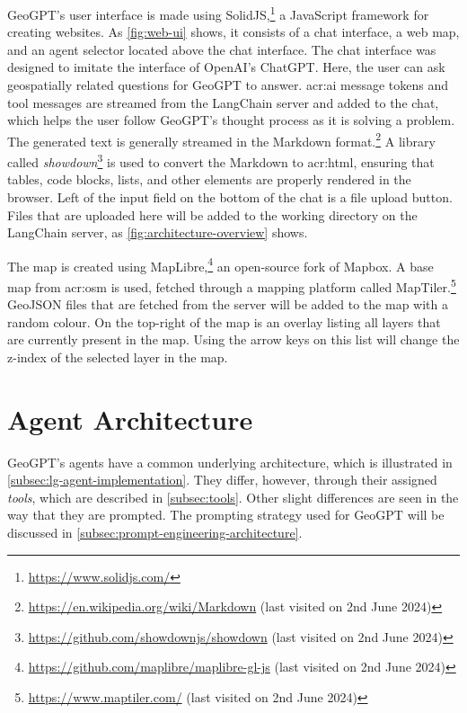 GeoGPT's user interface is made using SolidJS,\footnote{\url{https://www.solidjs.com/}} a JavaScript framework for creating websites. As \autoref{fig:web-ui} shows, it consists of a chat interface, a web map, and an agent selector located above the chat interface. The chat interface was designed to imitate the interface of OpenAI's ChatGPT. Here, the user can ask geospatially related questions for GeoGPT to answer. \acrshort{acr:ai} message tokens and tool messages are streamed from the LangChain server and added to the chat, which helps the user follow GeoGPT's thought process as it is solving a problem. The generated text is generally streamed in the Markdown format.\footnote{\url{https://en.wikipedia.org/wiki/Markdown} (last visited on 2nd June 2024)} A library called \textit{showdown}\footnote{\url{https://github.com/showdownjs/showdown} (last visited on 2nd June 2024)} is used to convert the Markdown to \acrshort{acr:html}, ensuring that tables, code blocks, lists, and other elements are properly rendered in the browser. Left of the input field on the bottom of the chat is a file upload button. Files that are uploaded here will be added to the working directory on the LangChain server, as \autoref{fig:architecture-overview} shows.

The map is created using MapLibre,\footnote{\url{https://github.com/maplibre/maplibre-gl-js} (last visited on 2nd June 2024)} an open-source fork of Mapbox. A base map from \gls{acr:osm} is used, fetched through a mapping platform called MapTiler.\footnote{\url{https://www.maptiler.com/} (last visited on 2nd June 2024)} GeoJSON files that are fetched from the server will be added to the map with a random colour. On the top-right of the map is an overlay listing all layers that are currently present in the map. Using the arrow keys on this list will change the z-index of the selected layer in the map.


\section{Agent Architecture}
\label{sec:agent-architecture}

GeoGPT's agents have a common underlying architecture, which is illustrated in \autoref{subsec:lg-agent-implementation}. They differ, however, through their assigned \textit{tools}, which are described in \autoref{subsec:tools}. Other slight differences are seen in the way that they are prompted. The prompting strategy used for GeoGPT will be discussed in \autoref{subsec:prompt-engineering-architecture}.

